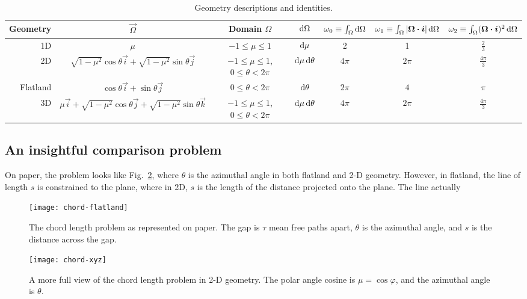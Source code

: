\begin{sidewaystable}[hp]
  \centering
  \renewcommand*{\arraystretch}{1.5}
  \begin{tabular}{rcccccc}
\toprule
   Geometry & $\vec{\Omega}$ & Domain $\Omega$ & $\mathop{}\!\mathrm{d}\Omega$
   & $\omega_0 \equiv \int_\Omega \mathop{}\!\mathrm{d}\Omega$
   & $\omega_1 \equiv \int_\Omega \left| \bm{\Omega}\bm{\cdot}\bm{i} \right| \mathop{}\!\mathrm{d}\Omega$
   & $\omega_2 \equiv \int_\Omega (\bm{\Omega}\bm{\cdot}\bm{i})^2 \mathop{}\!\mathrm{d}\Omega$
\\ \midrule
   1D & $\mu$ & $-1 \le \mu \le 1$ & $\mathop{}\!\mathrm{d}\mu$
   & 2 & 1 & $\frac{2}{3}$
   \\
   2D & $\sqrt{1-\mu^2} \cos \theta \vec{i}
   + \sqrt{1-\mu^2} \sin \theta \vec{j}$
   & $-1 \le \mu \le 1$, $0 \le \theta < 2\pi$ & $\mathop{}\!\mathrm{d}\mu \mathop{}\!\mathrm{d} \theta$
   & $4\pi$ & $2\pi$ & $\frac{4\pi}{3}$
   \\
   Flatland & $\cos \theta \vec{i} + \sin \theta \vec{j}$
   & $0 \le \theta < 2\pi$ & $\mathop{}\!\mathrm{d} \theta$
   & $2\pi$ & $4$ & $\pi$
   \\
   3D & $\mu \vec{i}
   + \sqrt{1-\mu^2} \cos \theta \vec{j}
   + \sqrt{1-\mu^2} \sin \theta \vec{k}$
   & $-1 \le \mu \le 1$, $0 \le \theta < 2\pi$ & $\mathop{}\!\mathrm{d}\mu \mathop{}\!\mathrm{d} \theta$
   & $4\pi$ & $2\pi$ & $\frac{4\pi}{3}$
\\ \bottomrule
  \end{tabular}
  \caption{Geometry descriptions and identities.}
  \label{tab:geometry}
\end{sidewaystable}

\clearpage
\subsection{An insightful comparison problem}

On paper, the problem looks like Fig.~\ref{fig:chordFlatland}, where $\theta$
is the azimuthal angle in both flatland and 2-D geometry. However, in flatland,
the line of length $s$ is constrained to the plane, where in 2D, $s$ is the
length of the distance projected onto the plane. The line actually 
\begin{figure}[htb]
  \centering
  \texttt{[image: chord-flatland]}
  \caption[The chord length problem as represented on paper.]%
  {The chord length problem as represented on paper. The gap is
  $\tau$ mean free paths apart, $\theta$ is the azimuthal angle, and $s$ is the
  distance across the gap.}
  \label{fig:chordFlatland}
\end{figure}

\begin{figure}[htb]
  \centering
  \texttt{[image: chord-xyz]}
  \caption[A more full view of the chord length problem in 2-D geometry.]%
  {A more full view of the chord length problem in 2-D geometry.
  The polar angle cosine is $\mu= \cos \varphi$, and the azimuthal angle is
  $\theta$.}
  \label{fig:chordFlatland}
\end{figure}


